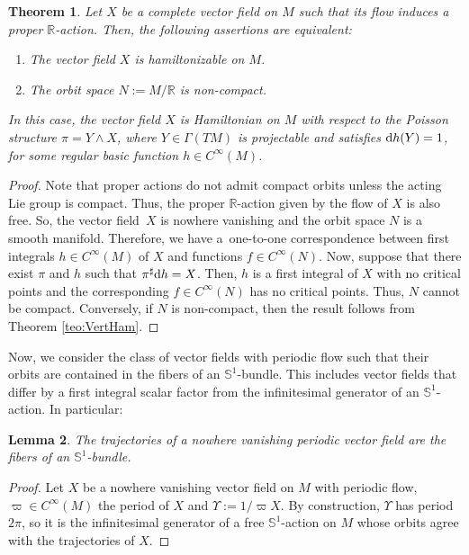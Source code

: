 \documentclass[pdftex]{sigma}%
\newcommand{\dd}{{\rm d}}
\numberwithin{equation}{section}
\newtheorem{Theorem}{Theorem}[section]
\newtheorem{Lemma}[Theorem]{Lemma}
\begin{document}
\begin{Theorem}\label{teo:ProperHam}
Let $X$ be a complete vector field on $M$ such that its flow induces a proper $\mathbb{R}$-action. Then, the following assertions are equivalent:
 \begin{enumerate}\itemsep=0pt
 \item[$1.$] The vector field $X$ is hamiltonizable on $M$.
 \item[$2.$] The orbit space $N := M / \mathbb{R}$ is non-compact.
 \end{enumerate}
In this case, the vector field $X$ is Hamiltonian on $M$ with respect to the Poisson structure $\pi = Y \wedge X$, where $Y \in \Gamma(TM)$ is projectable and satisfies $\dd{h}(Y)=1$, for some regular basic function $h \in C^{\infty}(M)$.
\end{Theorem}
\begin{proof}
Note that proper actions do not admit compact orbits unless the acting Lie group is compact. Thus, the proper $\mathbb{R}$-action given by the flow of $X$ is also free. So, the vector field~$X$ is nowhere vanishing and the orbit space $N$ is a smooth manifold. Therefore, we have a~one-to-one correspondence between first integrals $h \in C^{\infty}(M)$ of $X$ and functions $f \in C^{\infty}(N)$. Now, suppose that there exist $\pi$ and $h$ such that $\pi^{\sharp}\dd h = X$. Then, $h$ is a first integral of $X$ with no critical points and the corresponding $f \in C^{\infty}(N)$ has no critical points. Thus, $N$ cannot be compact. Conversely, if $N$ is non-compact, then the result follows from Theorem \ref{teo:VertHam}.
\end{proof}

Now, we consider the class of vector fields with periodic flow such that their orbits are contained in the fibers of an $\mathbb{S}^1$-bundle. This includes vector fields that differ by a first integral scalar factor from the infinitesimal generator of an $\mathbb{S}^{1}$-action. In particular:

\begin{Lemma}\label{lemma:Periodic}
 The trajectories of a nowhere vanishing periodic vector field are the fibers of an $\mathbb{S}^1$-bundle.
\end{Lemma}
\begin{proof}
Let $X$ be a nowhere vanishing vector field on $M$ with periodic flow, $\varpi\in C^{\infty}(M)$ the period of $X$ and $\Upsilon:=1/\varpi X$. By construction, $\Upsilon$ has period $2\pi$, so it is the infinitesimal generator of a free $\mathbb{S}^1$-action on $M$ whose orbits agree with the trajectories of $X$.
\end{proof}
\end{document}
